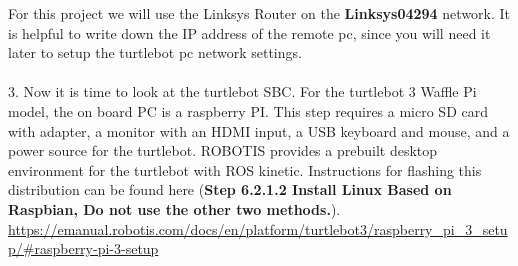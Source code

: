 \documentclass[12]{article}
\begin{document}
For this project we will use the Linksys Router on the \textbf{Linksys04294} network. It is helpful to write down the IP address of the remote pc, since you will need it later to setup the turtlebot pc network settings.\\\\

3. Now it is time to look at the turtlebot SBC. For the turtlebot 3 Waffle Pi model, the on board PC is a raspberry PI. This step requires a micro SD card with adapter, a monitor with an HDMI input, a USB keyboard and mouse, and a power source for the turtlebot. ROBOTIS provides a prebuilt desktop environment for the turtlebot with ROS kinetic. Instructions for flashing this distribution can be found here (\textbf{Step 6.2.1.2 Install Linux Based on Raspbian, Do not use the other two methods.}).\\

\url {https://emanual.robotis.com/docs/en/platform/turtlebot3/raspberry_pi_3_setup/#raspberry-pi-3-setup}
\end{document}

